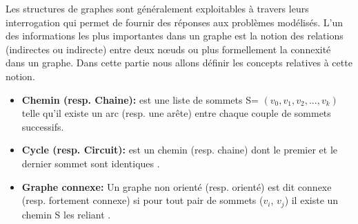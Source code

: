 Les structures de graphes sont généralement exploitables à travers leurs interrogation qui permet de fournir des réponses aux problèmes modélisés. L'un des informations les plus importantes dans un graphe est la notion des relations (indirectes ou indirecte) entre deux nœuds ou plus formellement la connexité dans un graphe. Dans cette partie nous allons définir les concepts relatives à cette notion.
	
	\begin{itemize} [label = $\bullet$]
		
			 
			 \item \textbf{Chemin (resp. Chaine):}
			est une liste de sommets S= $(v_{0},v_{1},v_{2},...,v_{k})$ telle qu’il existe un arc (resp. une arête) entre chaque couple de sommets successifs.
			 
			 
			  \item \textbf{Cycle (resp. Circuit):} 
			 est un chemin (resp. chaine) dont le premier et le dernier sommet sont identiques \citep{DUT}.
			 
			 		\item \textbf{Graphe connexe:}
			Un graphe non orienté (resp. orienté) est dit connexe (resp. fortement connexe) si pour tout pair de sommets ($v_{i}$, $v_{j}$) il existe un chemin S les reliant \citep{muller}.
			 
		\end{itemize}